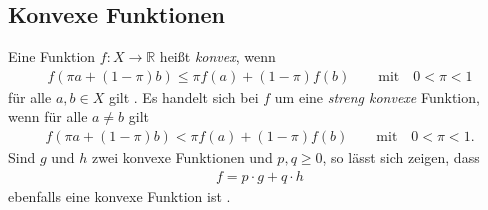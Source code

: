 \documentclass[12pt, a4paper]{report}\usepackage[]{graphicx}\usepackage[]{color}
\begin{document}
\begin{appendix}
\begin{comment}

Dazu wird die 
Eine intuitive Erklärung hierfür ist der Umstand, dass für eine Nebenbedingung $h_i(\mathbf{x})-t_i \le 0$ \textit{gelockert} werden kann, indem sie zu $h_i(\mathbf{x})-t_i \le u_i$ mit $u_i > 0$ erweitert wird. Dadurch erweitern sich das Set der Möglichen Punkte für eine Extremstelle

\end{comment}

\section{Konvexe Funktionen}\label{App_Konvexe_Funktionen}
Eine Funktion $f:X \rightarrow \mathbb{R}$ heißt \textit{konvex}, wenn
\begin{align*}\label{Eq_Convex_Funktion}
f(\pi a + (1-\pi)b) \leq \pi f(a) + (1-\pi) f(b) \qquad \text{mit} \quad 0 < \pi < 1
\end{align*}
für alle $a,b \in X$ gilt \cite{matousek2006understanding}. Es handelt sich bei $f$ um eine \textit{streng konvexe} Funktion, wenn für alle $a \neq b$ gilt
\begin{align*}
f(\pi a + (1-\pi)b) < \pi f(a) + (1-\pi) f(b) \qquad \text{mit} \quad 0 < \pi < 1.
\end{align*}
Sind $g$ und $h$ zwei konvexe Funktionen und $p,q \ge 0$, so lässt sich zeigen, dass
\begin{align*}
f=p \cdot g + q \cdot h
\end{align*}
ebenfalls eine konvexe Funktion ist \cite{boyd2004convex}.


\end{appendix}
\end{document}
